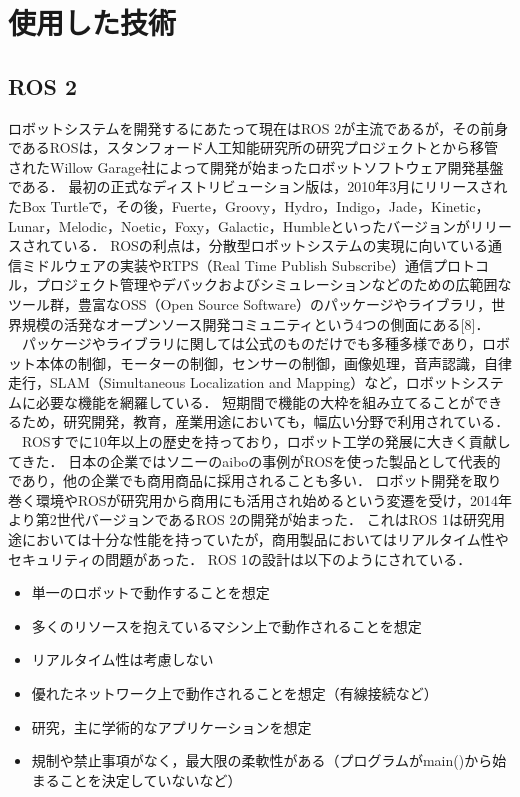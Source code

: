 \chapter{使用した技術}
\label{sec:usage}
\section{ROS 2}
ロボットシステムを開発するにあたって現在はROS 2が主流であるが，その前身であるROSは，スタンフォード人工知能研究所の研究プロジェクトとから移管されたWillow Garage社によって開発が始まったロボットソフトウェア開発基盤である．
最初の正式なディストリビューション版は，2010年3月にリリースされたBox Turtleで，その後，Fuerte，Groovy，Hydro，Indigo，Jade，Kinetic，Lunar，Melodic，Noetic，Foxy，Galactic，Humbleといったバージョンがリリースされている．
ROSの利点は，分散型ロボットシステムの実現に向いている通信ミドルウェアの実装やRTPS（Real Time Publish Subscribe）通信プロトコル，プロジェクト管理やデバックおよびシミュレーションなどのための広範囲なツール群，豊富なOSS（Open Source Software）のパッケージやライブラリ，世界規模の活発なオープンソース開発コミュニティという4つの側面にある[8]．\\
　パッケージやライブラリに関しては公式のものだけでも多種多様であり，ロボット本体の制御，モーターの制御，センサーの制御，画像処理，音声認識，自律走行，SLAM（Simultaneous Localization and Mapping）など，ロボットシステムに必要な機能を網羅している．
短期間で機能の大枠を組み立てることができるため，研究開発，教育，産業用途においても，幅広い分野で利用されている．\\
　ROSすでに10年以上の歴史を持っており，ロボット工学の発展に大きく貢献してきた．
日本の企業ではソニーのaiboの事例がROSを使った製品として代表的であり，他の企業でも商用商品に採用されることも多い．
ロボット開発を取り巻く環境やROSが研究用から商用にも活用され始めるという変遷を受け，2014年より第2世代バージョンであるROS 2の開発が始まった．
これはROS 1は研究用途においては十分な性能を持っていたが，商用製品においてはリアルタイム性やセキュリティの問題があった．
ROS 1の設計は以下のようにされている．
    \begin{itemize}
        \item 単一のロボットで動作することを想定
        \item 多くのリソースを抱えているマシン上で動作されることを想定
        \item リアルタイム性は考慮しない
        \item 優れたネットワーク上で動作されることを想定（有線接続など）
        \item 研究，主に学術的なアプリケーションを想定
        \item 規制や禁止事項がなく，最大限の柔軟性がある（プログラムがmain()から始まることを決定していないなど）
    \end{itemize}
